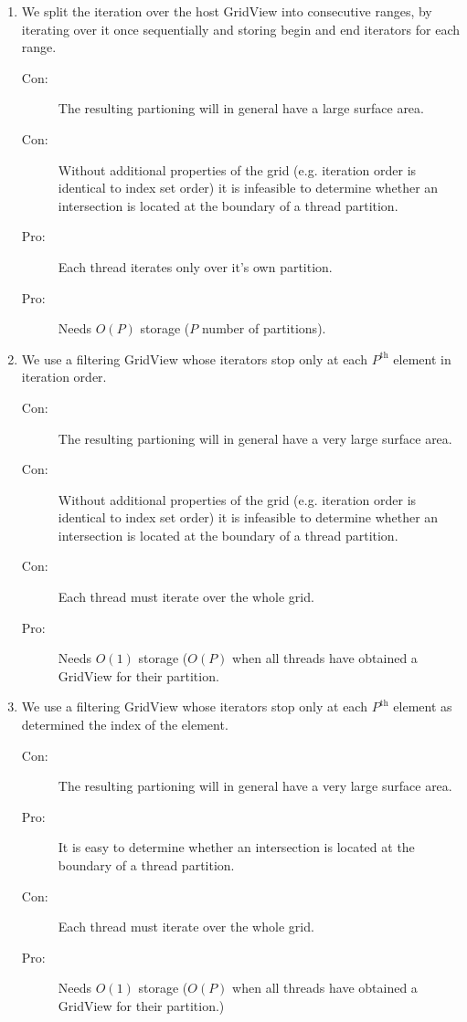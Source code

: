 \documentclass{article}
\begin{document}
\begin{enumerate}
\begin{description}
  \end{description}
\item \label{imp:iterator-ranges} We split the iteration over the host
  GridView into consecutive ranges, by iterating over it once sequentially and
  storing begin and end iterators for each range.
  \begin{description}
  \item[Con:] The resulting partioning will in general have a large surface
    area.
  \item[Con:] Without additional properties of the grid (e.g. iteration order
    is identical to index set order) it is infeasible to determine whether an
    intersection is located at the boundary of a thread partition.
  \item[Pro:] Each thread iterates only over it's own partition.
  \item[Pro:] Needs $O(P)$ storage ($P$ number of partitions).
  \end{description}
\item \label{imp:filtered-every} We use a filtering GridView whose iterators
  stop only at each $P^\text{th}$ element in iteration order.
  \begin{description}
  \item[Con:] The resulting partioning will in general have a very large
    surface area.
  \item[Con:] Without additional properties of the grid (e.g. iteration order
    is identical to index set order) it is infeasible to determine whether an
    intersection is located at the boundary of a thread partition.
  \item[Con:] Each thread must iterate over the whole grid.
  \item[Pro:] Needs $O(1)$ storage ($O(P)$ when all threads have obtained a
    GridView for their partition.
  \end{description}
\item \label{imp:filtered-every-index} We use a filtering GridView whose
  iterators stop only at each $P^\text{th}$ element as determined the index of
  the element.
  \begin{description}
  \item[Con:] The resulting partioning will in general have a very large
    surface area.
  \item[Pro:] It is easy to determine whether an intersection is located at
    the boundary of a thread partition.
  \item[Con:] Each thread must iterate over the whole grid.
  \item[Pro:] Needs $O(1)$ storage ($O(P)$ when all threads have obtained a
    GridView for their partition.)
  \end{description}
\end{enumerate}
\end{document}
